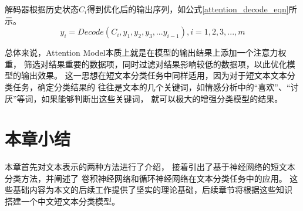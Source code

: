 解码器根据历史状态$C_i$得到优化后的输出序列，如公式\ref{attention_decode_eqn}所示。
\begin{equation}
    y_i=Decode\left ( C_i,y_1,y_2,y_3,...y_{i-1} \right ),i=1,2,3,...,m
    \label{attention_decode_eqn}
\end{equation}

总体来说，Attention Model本质上就是在模型的输出结果上添加一个注意力权重，
筛选对结果重要的数据项，同时过滤对结果影响较低的数据项，以此优化模型的输出效果。
这一思想在短文本分类任务中同样适用，因为对于短文本文本分类任务，确定分类结果的
往往是文本的几个关键词，如情感分析中的“喜欢”、“讨厌”等词，如果能够判断出这些关键词，
就可以极大的增强分类模型的结果。

\section{本章小结}
本章首先对文本表示的两种方法进行了介绍，
接着引出了基于神经网络的短文本分类方法，并阐述了
卷积神经网络和循环神经网络在文本分类任务中的应用。
这些基础内容为本文的后续工作提供了坚实的理论基础，后续章节将根据这些知识
搭建一个中文短文本分类模型。